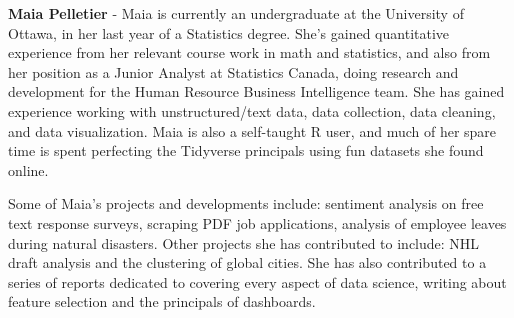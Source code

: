 \textbf{Maia Pelletier} - Maia is currently an undergraduate at the University of Ottawa, in her last year of a Statistics degree. She's gained quantitative experience from her relevant course work in math and statistics, and also from her position as a Junior Analyst at Statistics Canada, doing research and development for the Human Resource Business Intelligence team. She has gained experience working with unstructured/text data, data collection, data cleaning, and data visualization. Maia is also a self-taught R user, and much of her spare time is spent perfecting the Tidyverse principals using fun datasets she found online. \par Some of Maia's projects and developments include: sentiment analysis on free text response surveys, scraping PDF job applications, analysis of employee leaves during natural disasters. Other projects she has contributed to include: NHL draft analysis and the clustering of global cities. She has also contributed to a series of reports dedicated to covering every aspect of data science, writing about feature selection and the principals of dashboards.